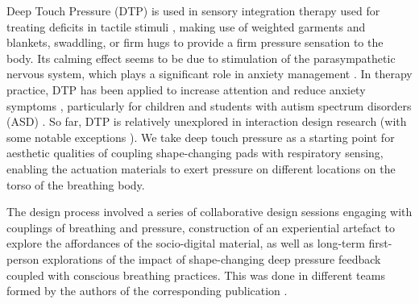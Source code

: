 Deep Touch Pressure (DTP) is used in sensory integration therapy used for treating deficits in tactile stimuli \cite{bundy_sensory_2002}, making use of weighted garments and blankets, swaddling, or firm hugs to provide a firm pressure sensation to the body. Its calming effect seems to be due to stimulation of the parasympathetic nervous system, which plays a significant role in anxiety management \cite{hsin-yung_chen_physiological_2013}. In therapy practice, DTP has been applied to increase attention \cite{fertel-daly_effects_2001} and reduce anxiety symptoms \cite{krauss_effects_1987}, particularly for children and students with autism spectrum disorders (ASD) \cite{lang_sensory_2012,alfaras_espinas_making_2021}. So far, DTP is relatively unexplored in interaction design research (with some notable exceptions \cite{delazio_force_2018, duvall_dynamic_2019, foo_user_2019, foo_soft_2020}). We take deep touch pressure as a starting point for aesthetic qualities of coupling shape-changing pads with respiratory sensing, enabling the actuation materials to exert pressure on different locations on the torso of the breathing body.

The design process involved a series of collaborative design sessions engaging with couplings of breathing and pressure, construction of an experiential artefact \cite{sundstrom_experiential_2011} to explore the affordances of the socio-digital material, as well as long-term first-person explorations of the impact of shape-changing deep pressure feedback coupled with conscious breathing practices. This was done in different teams formed by the authors of the corresponding publication \cite{jung_exploring_2021}.

